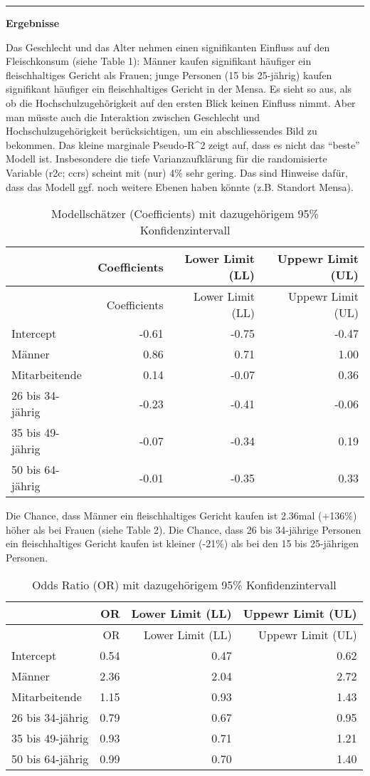 \documentclass[
]{article}
\begin{document}
\begin{center}\rule{0.5\linewidth}{0.5pt}\end{center}

\textbf{Ergebnisse}

Das Geschlecht und das Alter nehmen einen signifikanten Einfluss auf den
Fleischkonsum (siehe Table 1): Männer kaufen signifikant häufiger ein
fleischhaltiges Gericht als Frauen; junge Personen (15 bis 25-jährig)
kaufen signifikant häufiger ein fleischhaltiges Gericht in der Mensa. Es
sieht so aus, als ob die Hochschulzugehörigkeit auf den ersten Blick
keinen Einfluss nimmt. Aber man müsste auch die Interaktion zwischen
Geschlecht und Hochschulzugehörigkeit berücksichtigen, um ein
abschliessendes Bild zu bekommen. Das kleine marginale Pseudo-R\^{}2
zeigt auf, dass es nicht das ``beste'' Modell ist. Insbesondere die
tiefe Varianzaufklärung für die randomisierte Variable (r2c; ccrs)
scheint mit (nur) 4\% sehr gering. Das sind Hinweise dafür, dass das
Modell ggf. noch weitere Ebenen haben könnte (z.B. Standort Mensa).

\begin{longtable}[]{@{}lrrr@{}}
\caption{Modellschätzer (Coefficients) mit dazugehörigem 95\%
Konfidenzintervall}\tabularnewline
\toprule
& Coefficients & Lower Limit (LL) & Uppewr Limit (UL)\tabularnewline
\midrule
\endfirsthead
\toprule
& Coefficients & Lower Limit (LL) & Uppewr Limit (UL)\tabularnewline
\midrule
\endhead
Intercept & -0.61 & -0.75 & -0.47\tabularnewline
Männer & 0.86 & 0.71 & 1.00\tabularnewline
Mitarbeitende & 0.14 & -0.07 & 0.36\tabularnewline
26 bis 34-jährig & -0.23 & -0.41 & -0.06\tabularnewline
35 bis 49-jährig & -0.07 & -0.34 & 0.19\tabularnewline
50 bis 64-jährig & -0.01 & -0.35 & 0.33\tabularnewline
\bottomrule
\end{longtable}

Die Chance, dass Männer ein fleischhaltiges Gericht kaufen ist 2.36mal
(+136\%) höher als bei Frauen (siehe Table 2). Die Chance, dass 26 bis
34-jährige Personen ein fleischhaltiges Gericht kaufen ist kleiner
(-21\%) als bei den 15 bis 25-jährigen Personen.

\begin{longtable}[]{@{}lrrr@{}}
\caption{Odds Ratio (OR) mit dazugehörigem 95\%
Konfidenzintervall}\tabularnewline
\toprule
& OR & Lower Limit (LL) & Uppewr Limit (UL)\tabularnewline
\midrule
\endfirsthead
\toprule
& OR & Lower Limit (LL) & Uppewr Limit (UL)\tabularnewline
\midrule
\endhead
Intercept & 0.54 & 0.47 & 0.62\tabularnewline
Männer & 2.36 & 2.04 & 2.72\tabularnewline
Mitarbeitende & 1.15 & 0.93 & 1.43\tabularnewline
26 bis 34-jährig & 0.79 & 0.67 & 0.95\tabularnewline
35 bis 49-jährig & 0.93 & 0.71 & 1.21\tabularnewline
50 bis 64-jährig & 0.99 & 0.70 & 1.40\tabularnewline
\bottomrule
\end{longtable}
\end{document}
